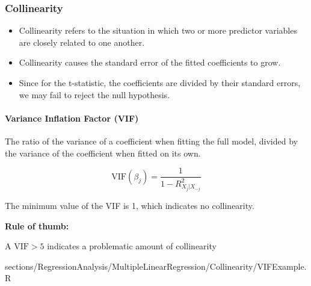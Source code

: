 \subsubsection{Collinearity}
	\begin{itemize}
	    \item Collinearity refers to the situation in which two or more predictor variables are closely related to one another. 
	    \item Collinearity causes the standard error of the fitted coefficients to grow.
	    \item Since for the t-statistic, the coefficients are divided by their standard errors, we may fail to reject the null hypothesis.
	\end{itemize}
	
	\paragraph{Variance Inflation Factor (VIF)}
		
		\RTheory
		{
			The ratio of the variance of a coefficient when fitting the full model, divided by the variance of the coefficient when fitted on its own.
			
			$$ \mathrm{VIF}(\beta_j) = \frac{1}{1-R^2_{X_j|X_{-j}}}$$
			
			The minimum value of the VIF is 1, which indicates no collinearity.
			
			\textbf{Rule of thumb:}
			
			A $\mathrm{VIF}>5$ indicates a problematic amount of collinearity
		}
		{
			sections/RegressionAnalysis/MultipleLinearRegression/Collinearity/VIFExample.R
		}